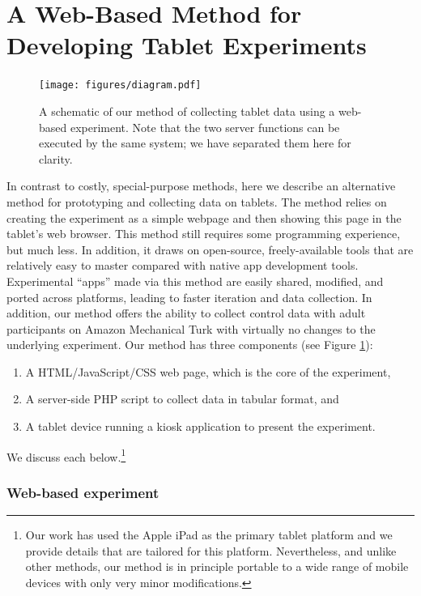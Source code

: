 \documentclass[man,noapacite]{apa2}
\begin{document}
\section{A Web-Based Method for Developing Tablet Experiments}


\begin{figure}[t] 
  \begin{center} 
    \texttt{[image: figures/diagram.pdf]} 
    \caption{\label{fig:diagram} A schematic of our method of collecting tablet data using a web-based experiment. Note that the two server functions can be executed by the same system; we have separated them here for clarity.}
  \end{center} 
\end{figure}

In contrast to costly, special-purpose methods, here we describe an alternative method for prototyping and collecting data on tablets. The method relies on creating the experiment as a simple webpage and then showing this page in the tablet's web browser. This method still requires some programming experience, but much less. In addition, it draws on open-source, freely-available tools that are relatively easy to master compared with native app development tools. Experimental ``apps'' made via this method are easily shared, modified, and ported across platforms, leading to faster iteration and data collection. In addition, our method offers the ability to collect control data with adult participants on Amazon Mechanical Turk \cite{paolacci2010,crump2013} with virtually no changes to the underlying experiment. Our method has three components (see Figure \ref{fig:diagram}):

\begin{enumerate}
\item A HTML/JavaScript/CSS web page, which is the core of the experiment, 
\item A server-side PHP script to collect data in tabular format, and
\item A tablet device running a kiosk application to present the experiment. 
\end{enumerate}

\noindent We discuss each below.\footnote{Our work has used the Apple iPad as the primary tablet platform and we provide details that are tailored for this platform. Nevertheless, and unlike other methods, our method is in principle portable to a wide range of mobile devices with only very minor modifications.}

\subsubsection{Web-based experiment}
\end{document}
